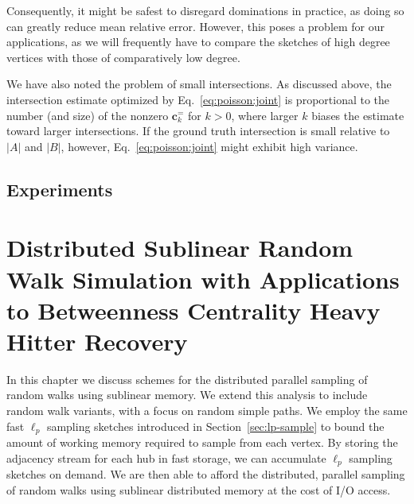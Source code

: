 \documentclass{report}
\begin{document}
Consequently, it might be safest to disregard dominations in practice, as doing so can greatly reduce mean relative error.
However, this poses a problem for our applications, as we will frequently have to compare the sketches of high degree vertices with those of comparatively low degree. 

We have also noted the problem of small intersections. 
As discussed above, the intersection estimate optimized by Eq.~\eqref{eq:poisson:joint} is proportional to the number (and size) of the nonzero $\mathbf{c}^{=}_k$ for $k>0$, where larger $k$ biases the estimate toward larger intersections. 
If the ground truth intersection is small relative to $|A|$ and $|B|$, however, Eq.~\eqref{eq:poisson:joint} might exhibit high variance.




\section{Experiments}
 \label{DS:sec:experiments}















\chapter{Distributed Sublinear Random Walk Simulation with Applications to Betweenness Centrality Heavy Hitter Recovery}
 \label{chap:walks}

In this chapter we discuss schemes for the distributed parallel sampling of random walks using sublinear memory.
We extend this analysis to include random walk variants, with a focus on random simple paths.
We employ the same fast $\ell_p$ sampling sketches introduced in Section~\ref{sec:lp-sample} to bound the amount of working memory required to  sample from each vertex. 
By storing the adjacency stream for each hub in fast storage, we can accumulate $\ell_p$ sampling sketches on demand.
We are then able to afford the distributed, parallel sampling of random walks using sublinear distributed memory at the cost of I/O access. 
\end{document}
